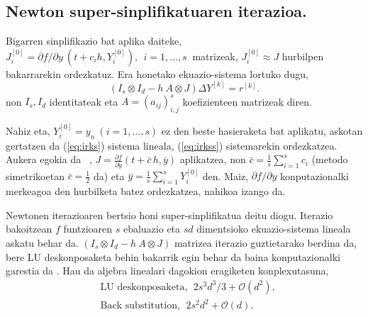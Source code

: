 
\subsection*{Newton super-sinplifikatuaren iterazioa.}

Bigarren sinplifikazio bat aplika daiteke, $J_i^{[0]}=\partial f / \partial y \ (t+c_ih, Y_i^{[0]}), \ \  i=1,\dots,s \ $ matrizeak,  $J_i^{[0]} \approx J$ hurbilpen bakarrarekin ordezkatuz. Era honetako ekuazio-sistema lortuko dugu, 
\begin{equation}
\label{eq:irkss}
(I_s \otimes I_d - h \ A \otimes J) \Delta Y^{[k]} = r^{[k]}.
\end{equation}
non $I_s,I_d$ identitateak eta $A=(a_{ij})_{i,j}^s$ koefizienteen matrizeak diren.

Nahiz eta, $Y_i^{[0]}=y_n \ (i=1,\dots,s)$  ez den beste hasieraketa bat aplikatu, askotan gertatzen da (\ref{eq:irks}) sistema lineala, (\ref{eq:irkss}) sistemarekin ordezkatzea. Aukera egokia da ~\cite{Xie2009},  $J=  \frac{\partial f}{\partial y}(t+\bar c \, h,\bar y)$ aplikatzea, non $\bar c = \frac{1}{s} \sum_{i=1}^{s}c_i$ (metodo simetrikoetan $\bar c = \frac12$ da)  eta  $\bar y =  \frac{1}{s} \sum_{i=1}^{s}Y_i^{[0]}$ den. Maiz, $\partial f/\partial y$  konputazionalki merkeagoa den hurbilketa batez ordezkatzea, nahikoa izango da.      

Newtonen iterazioaren bertsio honi super-sinplifikatua deitu diogu. Iterazio bakoitzean $f$ funtzioaren $s$ ebaluazio eta $sd$ dimentsioko ekuazio-sistema lineala askatu behar da. $(I_s \otimes I_d - h \ A \otimes J)$ matrizea iterazio guztietarako berdina da,  bere LU deskonposaketa behin bakarrik egin behar da baina konputazionalki garestia da \cite{Butcher1976,Hairer1996}. Hau da aljebra linealari dagokion eragiketen konplexutasuna,
\begin{align*}
&\text{LU deskonposaketa}, \ \ 2s^3d^3/3+\mathcal{O}(d^2), \\
&\text{Back substitution}, \ \ 2s^2d^2+\mathcal{O}(d).
\end{align*}

